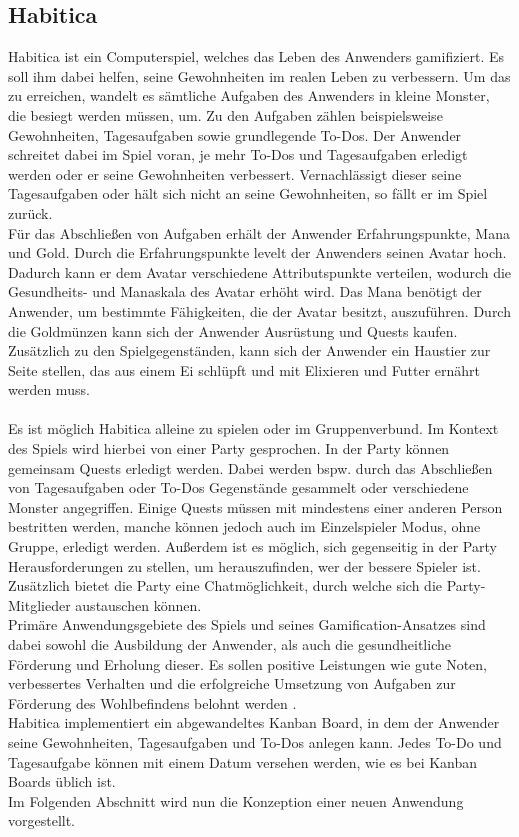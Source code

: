 \documentclass[sigconf, nonacm]{acmart}
\begin{document}
\subsection{Habitica}\label{sec:habitica}
Habitica ist ein Computerspiel, welches das Leben des Anwenders gamifiziert. Es soll ihm dabei helfen, seine Gewohnheiten im realen Leben zu verbessern. Um das zu erreichen, wandelt es sämtliche Aufgaben des Anwenders in kleine Monster, die besiegt werden müssen, um. Zu den Aufgaben zählen beispielsweise Gewohnheiten, Tagesaufgaben sowie grundlegende To-Dos. Der Anwender schreitet dabei im Spiel voran, je mehr To-Dos und Tagesaufgaben erledigt werden oder er seine Gewohnheiten verbessert. Vernachlässigt dieser seine Tagesaufgaben oder hält sich nicht an seine Gewohnheiten, so fällt er im Spiel zurück.
\\
Für das Abschließen von Aufgaben erhält der Anwender Erfahrungspunkte, Mana und Gold. Durch die Erfahrungspunkte levelt der Anwenders seinen Avatar hoch. Dadurch kann er dem Avatar verschiedene Attributspunkte verteilen, wodurch die Gesundheits- und Manaskala des Avatar erhöht wird. Das Mana benötigt der Anwender, um bestimmte Fähigkeiten, die der Avatar besitzt, auszuführen. Durch die Goldmünzen kann sich der Anwender Ausrüstung und Quests kaufen. Zusätzlich zu den Spielgegenständen, kann sich der Anwender ein Haustier zur Seite stellen, das aus einem Ei schlüpft und mit Elixieren und Futter ernährt werden muss.
\\
\\
Es ist möglich Habitica alleine zu spielen oder im Gruppenverbund. Im Kontext des Spiels wird hierbei von einer Party gesprochen. In der Party können gemeinsam Quests erledigt werden. Dabei werden bspw. durch das Abschließen von Tagesaufgaben oder To-Dos Gegenstände gesammelt oder verschiedene Monster angegriffen. Einige Quests müssen mit mindestens einer anderen Person bestritten werden, manche können jedoch auch im Einzelspieler Modus, ohne Gruppe, erledigt werden. Außerdem ist es möglich, sich gegenseitig in der Party Herausforderungen zu stellen, um herauszufinden, wer der bessere Spieler ist. Zusätzlich bietet die Party eine Chatmöglichkeit, durch welche sich die Party-Mitglieder austauschen können.
\\
Primäre Anwendungsgebiete des Spiels und seines Gamification-Ansatzes sind dabei sowohl die Ausbildung der Anwender, als auch die gesundheitliche Förderung und Erholung dieser. Es sollen positive Leistungen wie gute Noten, verbessertes Verhalten und die erfolgreiche Umsetzung von Aufgaben zur Förderung des Wohlbefindens belohnt werden \cite{noauthor_funktionen_nodate}.
\\
Habitica implementiert ein abgewandeltes Kanban Board, in dem der Anwender seine Gewohnheiten, Tagesaufgaben und To-Dos anlegen kann. Jedes To-Do und Tagesaufgabe können mit einem Datum versehen werden, wie es bei Kanban Boards üblich ist. \\
Im Folgenden Abschnitt wird nun die Konzeption einer neuen Anwendung vorgestellt.
\end{document}
